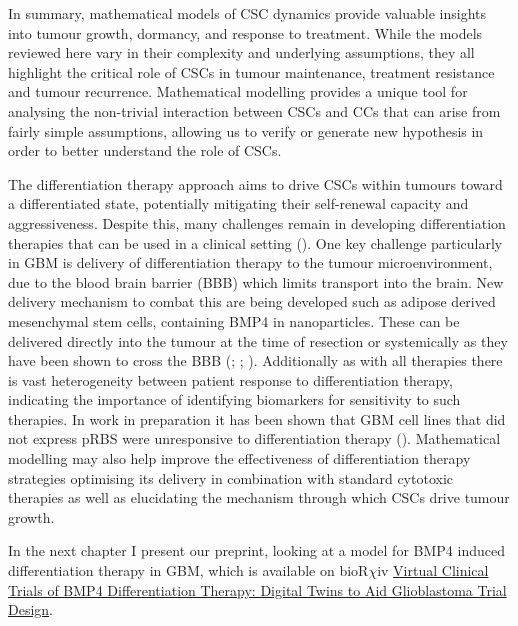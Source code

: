 \documentclass[
  letterpaper,
]{scrreprt}
\theoremstyle{definition}
\theoremstyle{remark}
\begin{document}
In summary, mathematical models of CSC dynamics provide valuable
insights into tumour growth, dormancy, and response to treatment. While
the models reviewed here vary in their complexity and underlying
assumptions, they all highlight the critical role of CSCs in tumour
maintenance, treatment resistance and tumour recurrence. Mathematical
modelling provides a unique tool for analysing the non-trivial
interaction between CSCs and CCs that can arise from fairly simple
assumptions, allowing us to verify or generate new hypothesis in order
to better understand the role of CSCs.

The differentiation therapy approach aims to drive CSCs within tumours
toward a differentiated state, potentially mitigating their self-renewal
capacity and aggressiveness. Despite this, many challenges remain in
developing differentiation therapies that can be used in a clinical
setting ().
One key challenge particularly in GBM is delivery of differentiation
therapy to the tumour microenvironment, due to the blood brain barrier
(BBB) which limits transport into the brain. New delivery mechanism to
combat this are being developed such as adipose derived mesenchymal stem
cells, containing BMP4 in nanoparticles. These can be delivered directly
into the tumour at the time of resection or systemically as they have
been shown to cross the BBB (;
;
). Additionally as
with all therapies there is vast heterogeneity between patient response
to differentiation therapy, indicating the importance of identifying
biomarkers for sensitivity to such therapies. In work in preparation it
has been shown that GBM cell lines that did not express pRBS were
unresponsive to differentiation therapy (). Mathematical modelling may also help improve the
effectiveness of differentiation therapy strategies optimising its
delivery in combination with standard cytotoxic therapies as well as
elucidating the mechanism through which CSCs drive tumour growth.

In the next chapter I present our preprint, looking at a model for BMP4
induced differentiation therapy in GBM, which is available on
bioR\(\chi\)iv \href{https://doi.org/10.1101/2024.08.22.609156}{Virtual
Clinical Trials of BMP4 Differentiation Therapy: Digital Twins to Aid
Glioblastoma Trial Design}.
\end{document}
